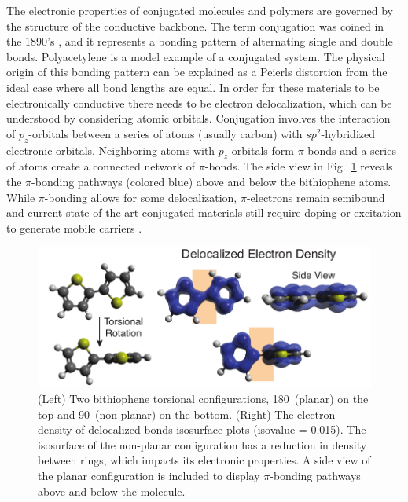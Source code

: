 The electronic properties of conjugated molecules and polymers are governed by the structure of the conductive backbone. The term conjugation was coined in the 1890’s \cite{Thiele1899}, and it represents a bonding pattern of alternating single and double bonds. Polyacetylene is a model example of a conjugated system. The physical origin of this bonding pattern can be explained as a Peierls distortion \cite{Roth2013} from the ideal case where all bond lengths are equal. In order for these materials to be electronically conductive there needs to be electron delocalization, which can be understood by considering atomic orbitals. Conjugation involves the interaction of $p_z$-orbitals between a series of atoms (usually carbon) with $sp^2$-hybridized electronic orbitals. Neighboring atoms with $p_z$ orbitals form $\pi$-bonds and a series of atoms create a connected network of $\pi$-bonds. The side view in Fig.~\ref{fig:eddb} reveals the $\pi$-bonding pathways (colored blue) above and below the bithiophene atoms. While $\pi$-bonding allows for some delocalization, $\pi$-electrons remain semibound and current state-of-the-art conjugated materials still require doping or excitation to generate mobile carriers \cite{Nobel2000}.

\begin{figure}[hbt!]
  \includegraphics{figures/chap1_intro/figure_delocal_copy.pdf}
  \caption[Electron Density of Delocalized Bonds]{(Left) Two bithiophene torsional configurations, 180\textdegree \  (planar) on the top and 90\textdegree \ (non-planar) on the bottom. (Right) The electron density of delocalized bonds \cite{Szczepanik2017} isosurface plots (isovalue = 0.015). The isosurface of the non-planar configuration has a reduction in density between rings, which impacts its electronic properties. A side view of the planar configuration is included to display $\pi$-bonding pathways above and below the molecule.}
  \label{fig:eddb}
\end{figure}

